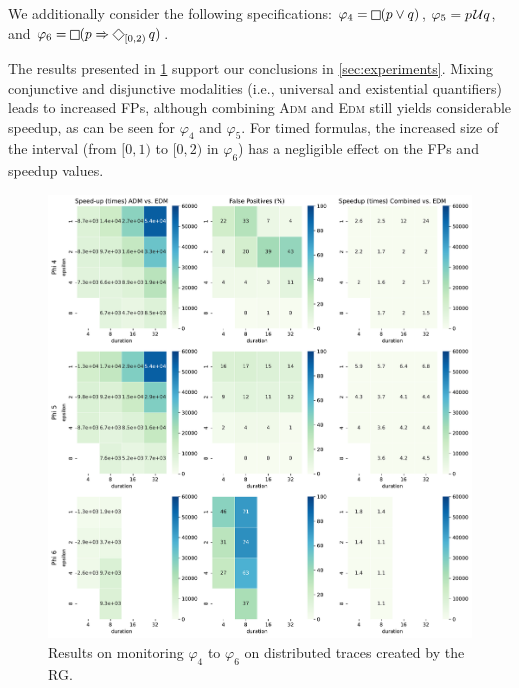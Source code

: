 We additionally consider the following specifications:
$\varphi_4 = \LTLg (p \lor q)$, $\varphi_5 = p \kern.1em\mathcal{U} q$, and $\varphi_6 = \LTLg (p \Rightarrow \LTLf_{[0,2)} q)$.

The results presented in \cref{fig:rgresults2} support our conclusions in \cref{sec:experiments}.
Mixing conjunctive and disjunctive modalities (i.e., universal and existential quantifiers) leads to increased FPs, although combining \textsc{Adm} and \textsc{Edm} still yields considerable speedup, as can be seen for $\varphi_4$ and $\varphi_5$.
For timed formulas, the increased size of the interval (from $[0,1)$ to $[0,2)$ in $\varphi_6$) has a negligible effect on the FPs and speedup values.

\begin{figure}[h]
	\begin{center}
		\includegraphics[width=\linewidth]{speedup_appendix}
		\caption{Results on monitoring $\varphi_{4}$ to $\varphi_{6}$ on distributed traces created by the RG.}
		\label{fig:rgresults2}
	\end{center}
	\vspace{1em}
\end{figure}
